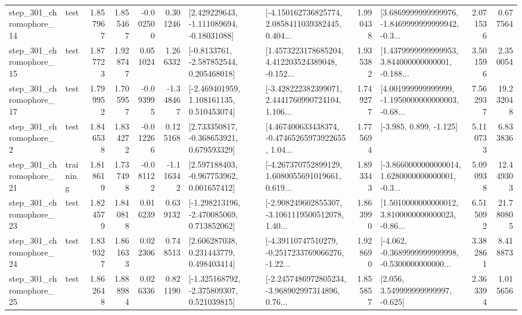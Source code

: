 \begin{tabular}{llrrrrllrlrr}
  step\_301\_chromophore\_14 &      test &      1.857967 &    1.855467 &     -0.002500 &  0.301246 &    [2.429229643, -1.111089694, -0.18031088] &  [-4.150162736825774, 2.0858411039382445, 0.404... &       1.990438 &  [3.6869999999999976, -1.8469999999999942, -0.3... &            2.071536 &          0.677564 \\
  step\_301\_chromophore\_15 &      test &      1.877723 &    1.928747 &      0.051024 &  1.266332 &     [-0.8133761, -2.587852544, 0.205468018] &  [1.4573223178685204, 4.412203524389048, -0.152... &       1.935382 &  [1.4379999999999953, 3.844000000000001, -0.188... &            3.501596 &          2.350054 \\
  step\_301\_chromophore\_17 &      test &      1.799952 &    1.705957 &     -0.093995 & -1.348467 &    [-2.469401959, 1.108161135, 0.510453074] &  [-3.428222382399071, 2.4441760990724104, 1.106... &       1.749277 &  [4.001999999999999, -1.1950000000000003, -0.68... &            7.562937 &         19.232048 \\
   step\_301\_chromophore\_2 &      test &      1.846538 &    1.834272 &     -0.012266 &  0.125168 &    [2.733350817, -0.368653921, 0.679593329] &  [4.467400633438374, -0.47465265973922655, 1.04... &       1.775694 &                            [-3.985, 0.899, -1.125] &            5.110733 &          6.833836 \\
  step\_301\_chromophore\_21 &  training &      1.818619 &    1.737498 &     -0.081122 & -1.116342 &    [2.597188403, -0.967753962, 0.001657412] &  [-4.267370752899129, 1.6080055691019661, 0.619... &       1.893343 &  [-3.8660000000000014, 1.6280000000000001, -0.3... &            5.090938 &         12.449303 \\
  step\_301\_chromophore\_23 &      test &      1.824579 &    1.840818 &      0.016239 &  0.639132 &   [-1.298213196, -2.470085069, 0.713852062] &  [-2.908249602855307, -3.1061119500512078, 1.40... &       1.863990 &  [1.5010000000000012, 3.8100000000000023, -0.86... &            6.515092 &         21.780805 \\
  step\_301\_chromophore\_24 &      test &      1.839327 &    1.861633 &      0.022306 &  0.748513 &     [2.606287038, 0.231443779, 0.498403414] &  [-4.39110747510279, -0.2517233769066276, -1.22... &       1.928690 &  [-4.062, -0.3689999999999998, -0.5300000000000... &            3.382861 &          8.418873 \\
  step\_301\_chromophore\_25 &      test &      1.862648 &    1.888984 &      0.026336 &  0.821190 &   [-1.325168792, -2.375809307, 0.521039815] &  [-2.2457486972805234, -3.968902997314896, 0.76... &       1.855857 &                 [2.056, 3.549999999999997, -0.625] &            2.363394 &          1.015656 \\

\end{tabular}
